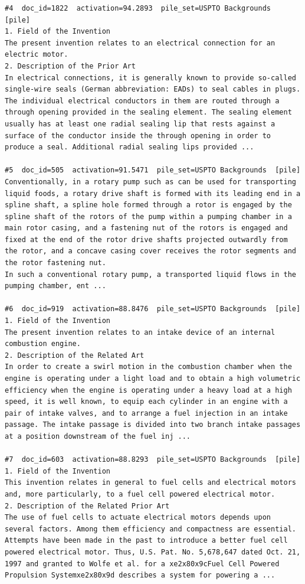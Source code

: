 \begin{verbatim}
#4  doc_id=1822  activation=94.2893  pile_set=USPTO Backgrounds  [pile]
1. Field of the Invention
The present invention relates to an electrical connection for an electric motor.
2. Description of the Prior Art
In electrical connections, it is generally known to provide so-called single-wire seals (German abbreviation: EADs) to seal cables in plugs. The individual electrical conductors in them are routed through a through opening provided in the sealing element. The sealing element usually has at least one radial sealing lip that rests against a surface of the conductor inside the through opening in order to produce a seal. Additional radial sealing lips provided ...

#5  doc_id=505  activation=91.5471  pile_set=USPTO Backgrounds  [pile]
Conventionally, in a rotary pump such as can be used for transporting liquid foods, a rotary drive shaft is formed with its leading end in a spline shaft, a spline hole formed through a rotor is engaged by the spline shaft of the rotors of the pump within a pumping chamber in a main rotor casing, and a fastening nut of the rotors is engaged and fixed at the end of the rotor drive shafts projected outwardly from the rotor, and a concave casing cover receives the rotor segments and the rotor fastening nut.
In such a conventional rotary pump, a transported liquid flows in the pumping chamber, ent ...

#6  doc_id=919  activation=88.8476  pile_set=USPTO Backgrounds  [pile]
1. Field of the Invention
The present invention relates to an intake device of an internal combustion engine.
2. Description of the Related Art
In order to create a swirl motion in the combustion chamber when the engine is operating under a light load and to obtain a high volumetric efficiency when the engine is operating under a heavy load at a high speed, it is well known, to equip each cylinder in an engine with a pair of intake valves, and to arrange a fuel injection in an intake passage. The intake passage is divided into two branch intake passages at a position downstream of the fuel inj ...

#7  doc_id=603  activation=88.8293  pile_set=USPTO Backgrounds  [pile]
1. Field of the Invention
This invention relates in general to fuel cells and electrical motors and, more particularly, to a fuel cell powered electrical motor.
2. Description of the Related Prior Art
The use of fuel cells to actuate electrical motors depends upon several factors. Among them efficiency and compactness are essential.
Attempts have been made in the past to introduce a better fuel cell powered electrical motor. Thus, U.S. Pat. No. 5,678,647 dated Oct. 21, 1997 and granted to Wolfe et al. for a xe2x80x9cFuel Cell Powered Propulsion Systemxe2x80x9d describes a system for powering a ...


\end{verbatim}
